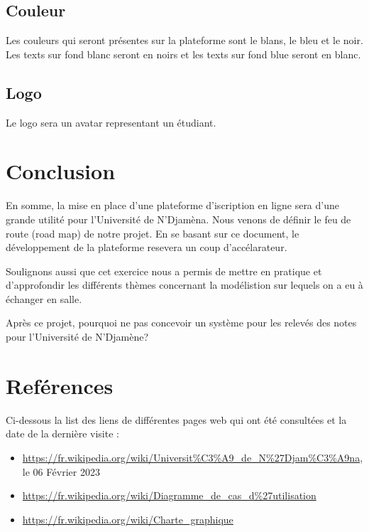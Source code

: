 \documentclass[12pt,a4paper]{article}
\begin{document}
	\subsection{Couleur}
	Les couleurs qui seront présentes sur la plateforme sont le blans, le bleu et le noir. Les texts sur fond blanc seront en noirs et les texts sur fond blue seront en blanc.
	
	\subsection{Logo}
	Le logo sera un avatar representant un étudiant.
	
	
	
	\newpage
	\section*{Conclusion}
	En somme, la mise en place d'une plateforme d'iscription en ligne sera d'une grande utilité pour l'Université de N'Djamèna. Nous venons de définir le feu de route (road map) de notre projet. En se basant sur ce document, le développement de la plateforme resevera un coup d'accélarateur. 
	
	Soulignons aussi que cet exercice nous a permis de mettre en pratique et d'approfondir les différents thèmes concernant la modélistion sur lequels on a eu à échanger en salle. 
	
	Après ce projet, pourquoi ne pas concevoir un système pour les relevés des notes pour l'Université de N'Djamène?
	
	\newpage
	\listoffigures
	\listoftables
	
	\newpage
	\section*{Reférences}
	Ci-dessous la list des liens de différentes pages web qui ont été consultées et la date de la dernière visite :
	\begin{itemize}
		\item \href{https://fr.wikipedia.org/wiki/Universit\%C3\%A9\_de\_N\%27Djam\%C3\%A9na}{https://fr.wikipedia.org/wiki/Universit\%C3\%A9\_de\_N\%27Djam\%C3\%A9na}, le 06 Février 2023
		\item \href{https://fr.wikipedia.org/wiki/Diagramme_de_cas_d\%27utilisation}{https://fr.wikipedia.org/wiki/Diagramme\_de\_cas\_d\%27utilisation}
		\item \href{https://fr.wikipedia.org/wiki/Charte_graphique}{https://fr.wikipedia.org/wiki/Charte\_graphique}
	\end{itemize}	
\end{document}
